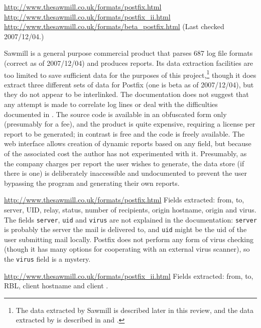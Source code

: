 \noindent{}\url{http://www.thesawmill.co.uk/formats/postfix.html} \newline{}
\url{http://www.thesawmill.co.uk/formats/postfix_ii.html} \newline{}
\url{http://www.thesawmill.co.uk/formats/beta_postfix.html} \newline{}
(Last checked 2007/12/04.)

Sawmill is a general purpose commercial product that parses 687 log file
formats (correct as of 2007/12/04) and produces reports.  Its data
extraction facilities are too limited to save sufficient data for the
purposes of this project,\footnote{The data extracted by Sawmill is
described later in this review, and the data extracted by \PLP{} is
described in  and .} though it does extract three different sets of data for Postfix
(one is beta as of 2007/12/04), but they do not appear to be interlinked.
The documentation does not suggest that any attempt is made to correlate
log lines or deal with the difficulties documented in
.  The source code is available in an obfuscated
form only (presumably for a fee), and the product is quite expensive,
requiring a license per report to be generated; in contrast \parsername{}
is free and the code is freely available.  The web interface allows
creation of dynamic reports based on any field, but because of the
associated cost the author has not experimented with it.  Presumably, as
the company charges per report the user wishes to generate, the data store
(if there is one) is deliberately inaccessible and undocumented to prevent
the user bypassing the program and generating their own reports.

\url{http://www.thesawmill.co.uk/formats/postfix.html} \newline{} Fields
extracted: from, to, server, UID, relay, status, number of recipients,
origin hostname, origin \IP{} and virus.  The fields \texttt{server},
\texttt{uid} and \texttt{virus} are not explained in the documentation:
\texttt{server} is probably the server the mail is delivered to, and
\texttt{uid} might be the uid of the user submitting mail locally.  Postfix
does not perform any form of virus checking (though it has many options for
cooperating with an external virus scanner), so the \texttt{virus} field is
a mystery.

\url{http://www.thesawmill.co.uk/formats/postfix_ii.html} \newline{} Fields
extracted: from, to, RBL, client hostname and client \IP{}\@.

